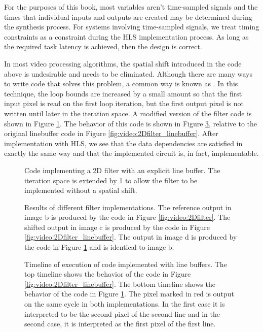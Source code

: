 For the purposes of this book, most variables aren't time-sampled signals and the times that individual inputs and outputs are created may be determined during the synthesis process.  For systems involving time-sampled signals, we treat timing constraints as a constraint during the HLS implementation process.  As long as the required task latency is achieved, then the design is correct.

In most video processing algorithms, the spatial shift introduced in the code above is undesirable and needs to be eliminated.  Although there are many ways to write code that solves this problem, a common way is known as .  In this technique, the loop bounds are increased by a small amount so that the first input pixel is read on the first loop iteration, but the first output pixel is not written until later in the iteration space.  A modified version of the filter code is shown in Figure \ref{fig:video:2Dfilter_linebuffer_extended}.  The behavior of this code is shown in Figure \ref{fig:video:timelines}, relative to the original linebuffer code in Figure \ref{fig:video:2Dfilter_linebuffer}.  After implementation with HLS, we see that the data dependencies are satisfied in exactly the same way and that the implemented circuit is, in fact, implementable.

\begin{figure}

\caption{Code implementing a 2D filter with an explicit line buffer.  The iteration space is extended by 1 to allow the filter to be implemented without a spatial shift.}\label{fig:video:2Dfilter_linebuffer_extended}
\end{figure}

\begin{figure}
\centering

\caption{Results of different filter implementations. The reference output in image b is produced by the code in Figure \ref{fig:video:2Dfilter}.  The shifted output in image c is produced by the code in Figure \ref{fig:video:2Dfilter_linebuffer}.  The output in image d is produced by the code in Figure \ref{fig:video:2Dfilter_linebuffer_extended} and is identical to image b.}\label{fig:video:filter2D_results_withshifting}
\end{figure}

\begin{figure}
\centering

\caption{Timeline of execution of code implemented with line buffers.  The top timeline shows the behavior of the code in  Figure \ref{fig:video:2Dfilter_linebuffer}.  The bottom timeline shows the behavior of the code in  Figure \ref{fig:video:2Dfilter_linebuffer_extended}.  The pixel marked in red is output on the same cycle in both implementations.  In the first case it is interpreted to be the second pixel of the second line and in the second case, it is interpreted as the first pixel of the first line.}\label{fig:video:timelines}
\end{figure}

